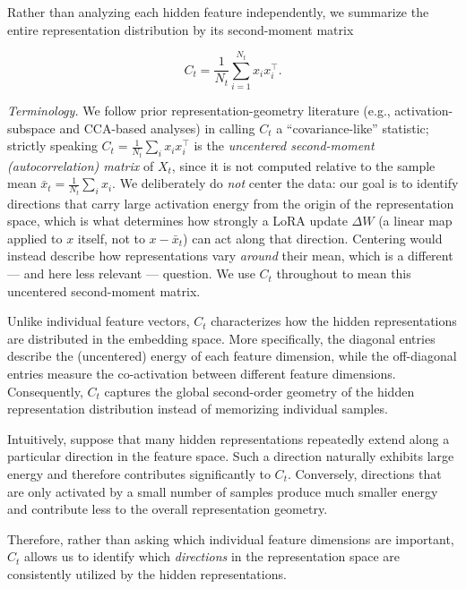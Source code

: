 \documentclass[a4paper]{article}
\begin{document}
Rather than analyzing each hidden feature independently, we summarize the entire representation distribution by its second-moment matrix

\begin{equation}
C_t
=
\frac{1}{N_t}
\sum_{i=1}^{N_t}
x_i x_i^{\top}.
\end{equation}

\emph{Terminology.} We follow prior representation-geometry literature (e.g., activation-subspace and CCA-based analyses) in calling $C_t$ a ``covariance-like'' statistic; strictly speaking $C_t=\frac{1}{N_t}\sum_i x_ix_i^\top$ is the \emph{uncentered second-moment (autocorrelation) matrix} of $X_t$, since it is not computed relative to the sample mean $\bar x_t = \frac1{N_t}\sum_i x_i$. We deliberately do \emph{not} center the data: our goal is to identify directions that carry large activation energy from the origin of the representation space, which is what determines how strongly a LoRA update $\Delta W$ (a linear map applied to $x$ itself, not to $x-\bar x_t$) can act along that direction. Centering would instead describe how representations vary \emph{around} their mean, which is a different — and here less relevant — question. We use $C_t$ throughout to mean this uncentered second-moment matrix.

Unlike individual feature vectors, $C_t$ characterizes how the hidden representations are distributed in the embedding space. More specifically, the diagonal entries describe the (uncentered) energy of each feature dimension, while the off-diagonal entries measure the co-activation between different feature dimensions. Consequently, $C_t$ captures the global second-order geometry of the hidden representation distribution instead of memorizing individual samples.

Intuitively, suppose that many hidden representations repeatedly extend along a particular direction in the feature space. Such a direction naturally exhibits large energy and therefore contributes significantly to $C_t$. Conversely, directions that are only activated by a small number of samples produce much smaller energy and contribute less to the overall representation geometry.

Therefore, rather than asking which individual feature dimensions are important, $C_t$ allows us to identify which \emph{directions} in the representation space are consistently utilized by the hidden representations.

\end{document}
